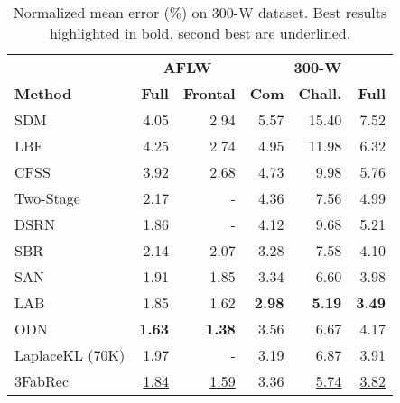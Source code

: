 \documentclass[10pt,twocolumn,letterpaper]{article}
\begin{document}
\begin{table}
	\footnotesize
	\begin{center}
		\begin{tabular}{l| rr| rrr}
			\toprule
			
			& \multicolumn{2}{c}{\bfseries  AFLW} & \multicolumn{3}{c}{\bfseries  300-W}  \\
			\bfseries           Method &  \bf Full & \bf Frontal & \bfseries Com & \bfseries Chall. & \bfseries  Full \\
			
			\midrule
			
SDM \cite{xiong2013supervised}                   &   4.05        &     2.94  &     5.57     &     15.40              &            7.52    \\
			LBF \cite{ren2014face} &  4.25        &     2.74  &        4.95     &    11.98               &            6.32    \\
			CFSS \cite{Zhu2015}     & 3.92   &  2.68  &    4.73     &    9.98        &            5.76    \\
Two-Stage \cite{Lv2017} & 2.17 & - &     4.36 &     7.56    &  4.99  \\
			
DSRN \cite{miao2018direct}   & 1.86 & - &        4.12     &     9.68               &            5.21    \\
SBR \cite{dong2018supervision} &     2.14        &     2.07  &    3.28     &     7.58               &            4.10    \\
SAN\cite{Dong2018} &     1.91    &   1.85 &     3.34     &     6.60               &            3.98    \\
			LAB \cite{Wu2018}    &   1.85   & 1.62 &   \bf{2.98}     &   \bf 5.19   & \bf 3.49    \\


ODN \cite{Meilu2019}   &   \bf 1.63 & \bf 1.38 &      3.56     &     6.67               &            4.17    \\
LaplaceKL (70K) \cite{Robinson2019} & 1.97 & - &  \underline{3.19}   &     6.87      &     3.91    \\
\midrule
			3FabRec                 &   \underline{1.84}  & \underline{1.59} &     3.36     &     \underline{5.74}    &    \underline{3.82}    \\
			\midrule
			\bottomrule
		\end{tabular}	
	\end{center}
	\vspace{-0.5cm}
	\caption{\small Normalized mean error (\%) on 300-W dataset. Best results highlighted in bold, second best are underlined.}	
	\label{tab:SOA}
	\vspace{-0.0cm}\end{table}
\end{document}
